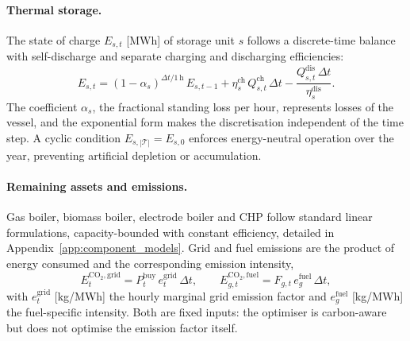 \documentclass[a4paper,fleqn]{cas-sc}
\begin{document}
\paragraph{Thermal storage.}
The state of charge $E_{s,t}$ [MWh] of storage unit $s$ follows a discrete-time balance
with self-discharge and separate charging and discharging efficiencies:
\begin{equation}
  E_{s,t} = (1 - \alpha_s)^{\Delta t/\mathrm{1\,h}}\, E_{s,t-1}
    + \eta_s^{\mathrm{ch}}\, Q_{s,t}^{\mathrm{ch}}\, \Delta t
    - \frac{Q_{s,t}^{\mathrm{dis}}\, \Delta t}{\eta_s^{\mathrm{dis}}}.
  \label{eq:storage_soc}
\end{equation}
The coefficient $\alpha_s$, the fractional standing loss per hour, represents losses of
the vessel, and the exponential form makes the discretisation independent of the time step.
A cyclic condition $E_{s,|\mathcal{T}|} = E_{s,0}$ enforces energy-neutral operation over
the year, preventing artificial depletion or accumulation.

\paragraph{Remaining assets and emissions.}
Gas boiler, biomass boiler, electrode boiler and CHP follow standard linear formulations,
capacity-bounded with constant efficiency, detailed in
Appendix~\ref{app:component_models}. Grid and fuel emissions are the product of energy
consumed and the corresponding emission intensity,
\begin{equation}
  E_t^{\mathrm{CO_2,grid}} =
    P_t^{\mathrm{buy}}\, e_t^{\mathrm{grid}}\, \Delta t,
  \qquad
  E_{g,t}^{\mathrm{CO_2,fuel}} =
    F_{g,t}\, e_g^{\mathrm{fuel}}\, \Delta t,
  \label{eq:emissions}
\end{equation}
with $e_t^{\mathrm{grid}}$ [kg/MWh] the hourly marginal grid emission factor and
$e_g^{\mathrm{fuel}}$ [kg/MWh] the fuel-specific intensity. Both are fixed inputs: the
optimiser is carbon-aware but does not optimise the emission factor itself.
\end{document}
